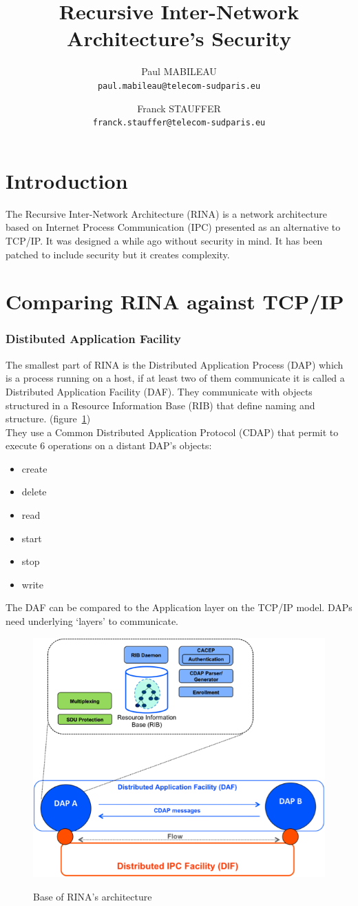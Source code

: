 \documentclass[a4paper]{proc}
\author{Paul MABILEAU\\\texttt{paul.mabileau@telecom-sudparis.eu} \and Franck STAUFFER\\\texttt{franck.stauffer@telecom-sudparis.eu}}
\title{\textbf{Recursive Inter-Network Architecture's Security}}
\begin{document}
\maketitle
\tableofcontents
\newpage
\part*{Introduction}
The Recursive Inter-Network Architecture (RINA) is a network architecture based on Internet Process Communication (IPC) presented as an alternative to TCP/IP\@.
It was designed a while ago without security in mind. 
It has been patched to include security but it creates complexity.\cite{assessing-security}

\part{Comparing RINA against TCP/IP}
\section{Distibuted Application Facility}
The smallest part of RINA is the Distributed Application Process (DAP) which is a process running on a host, if at least two of them communicate it is called a Distributed Application Facility (DAF).
They communicate with objects structured in a Resource Information Base (RIB) that define naming and structure. (figure~\ref{daf})\\
They use a Common Distributed Application Protocol (CDAP) that permit to execute 6 operations on a distant DAP's objects:
\begin{itemize}
\item create
\item delete
\item read
\item start
\item stop
\item write
\end{itemize}
The DAF can be compared to the Application layer on the TCP/IP model. DAPs need underlying `layers' to communicate.\cite{wiki}

\begin{figure}
    \centering
    \includegraphics[width=0.9\columnwidth]{DAF.png}\label{daf}\caption{Base of RINA's architecture}
\end{figure}
\end{document}
